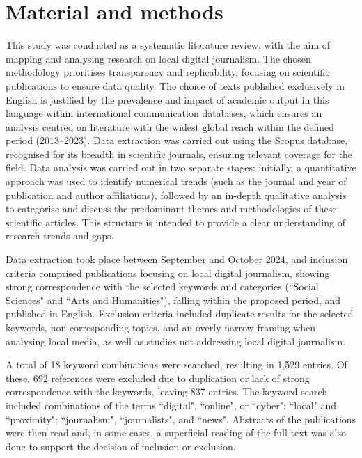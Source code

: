 \documentclass[english]{textolivre}
\begin{document}
\section{Material and methods}
This study was conducted as a systematic literature review, with the aim of mapping and analysing research on local digital journalism. The chosen methodology prioritises transparency and replicability, focusing on scientific publications to ensure data quality. The choice of texts published exclusively in English is justified by the prevalence and impact of academic output in this language within international communication databases, which ensures an analysis centred on literature with the widest global reach within the defined period (2013–2023). Data extraction was carried out using the Scopus database, recognised for its breadth in scientific journals, ensuring relevant coverage for the field. Data analysis was carried out in two separate stages: initially, a quantitative approach was used to identify numerical trends (such as the journal and year of publication  and author affiliations), followed by an in-depth qualitative analysis to categorise and discuss the predominant themes and methodologies of these scientific articles. This structure is intended to provide a clear understanding of research trends and gaps.

Data extraction took place between September and October 2024, and inclusion criteria comprised publications focusing on local digital journalism, showing strong correspondence with the selected keywords and categories (``Social Sciences" and ``Arts and Humanities"), falling within the proposed period, and published in English. Exclusion criteria included duplicate results for the selected keywords, non-corresponding topics, and an overly narrow framing when analysing local media, as well as studies not addressing local digital journalism.

A total of 18 keyword combinations were searched, resulting in 1,529 entries. Of these, 692 references were excluded due to duplication or lack of strong correspondence with the keywords, leaving 837 entries. The keyword search included combinations of the terms ``digital", ``online", or ``cyber"; ``local" and ``proximity"; ``journalism", ``journalists", and ``news". Abstracts of the publications were then read and, in some cases, a superficial reading of the full text was also done to support the decision of inclusion or exclusion.
\end{document}
